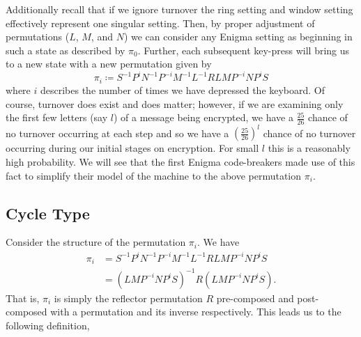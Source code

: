 \noindent Additionally recall that if we ignore turnover the ring setting and
window setting effectively represent one singular setting.
Then, by proper adjustment of permutations ($L$, $M$, and $N$) we can
consider any Enigma setting as beginning in such a state as described
by $\pi_0$. Further, each subsequent key-press will bring us to a new
state with a new permutation given by
\[
  \pi_i \coloneq S^{-1}P^{i}N^{-1}P^{-i}M^{-1}L^{-1}RLMP^{-i}NP^{i}S
\]
where $i$ describes the number of times we have depressed the
keyboard. Of course, turnover does exist and does matter; however, if
we are examining only the first few letters (say $l$) of a message
being encrypted, we have a $\frac{25}{26}$ chance of no turnover
occurring at each step and so we have a $(\frac{25}{26})^l$ chance of
no turnover occurring during our initial stages on encryption. For
small $l$ this is a reasonably high probability. We will see that the
first Enigma code-breakers made use of this
fact to simplify their model of the machine to the above permutation $\pi_i$.

\subsection{Cycle Type}
Consider the structure of the permutation $\pi_i$. We have
\begin{align*}
  \pi_i & = S^{-1}P^{i}N^{-1}P^{-i}M^{-1}L^{-1}RLMP^{-i}NP^{i}S \\
  & = (LMP^{-i}NP^{i}S)^{-1}R(LMP^{-i}NP^{i}S).
\end{align*}
That is, $\pi_i$ is simply the reflector permutation $R$
pre-composed and post-composed with a permutation and its inverse
respectively. This leads us to the following definition,

